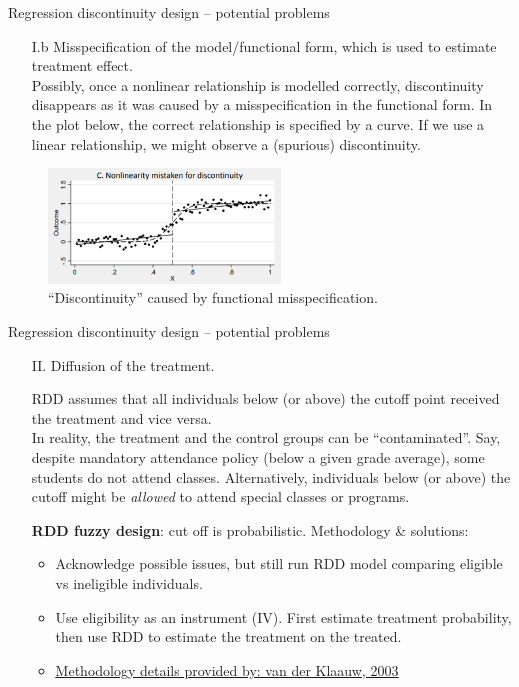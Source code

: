\documentclass{beamer}
\begin{document}
\begin{frame}{Regression discontinuity design -- potential problems}
\begin{itemize}
    \item[I.b] Misspecification of the model/functional form, which is used to estimate treatment effect.\\ 
    \bigskip
    Possibly, once a nonlinear relationship is modelled correctly, discontinuity disappears as it was caused by a misspecification in the functional form. In the plot below, the correct relationship is specified by a curve. If we use a linear relationship, we might observe a (spurious) discontinuity.
\end{itemize}
\begin{figure}
    \centering
    \includegraphics[width=0.55\textwidth]{./IMG/RDD3.png}
    \caption*{``Discontinuity'' caused by functional misspecification.} \label{fig:my_label2}
\end{figure}    
\end{frame}
\begin{frame}{Regression discontinuity design -- potential problems}
\begin{itemize}
    \item[II.] Diffusion of the treatment.\\ \bigskip \small
    
    RDD assumes that all individuals below (or above) the cutoff point received the treatment and vice versa.\\ \smallskip
    In reality, the treatment and the control groups can be ``contaminated''. Say, despite mandatory attendance policy (below a given grade average), some students do not attend classes. Alternatively, individuals below (or above) the cutoff might be \textit{allowed} to attend special classes or programs. \\ \medskip

    \textbf{RDD fuzzy design}: cut off is probabilistic. Methodology \& solutions:\\

    \begin{itemize}
        \item Acknowledge possible issues, but still run RDD model comparing eligible vs ineligible individuals.
        \item Use eligibility as an instrument (IV). First estimate treatment probability, then use RDD to estimate the treatment on the treated.
        \item \textcolor{blue}{\underline{\href{https://onlinelibrary.wiley.com/doi/10.1111/1468-2354.t01-1-00055}{Methodology details provided by: van der Klaauw, 2003}}}
    \end{itemize}


\end{itemize}
\end{frame}
\end{document}
